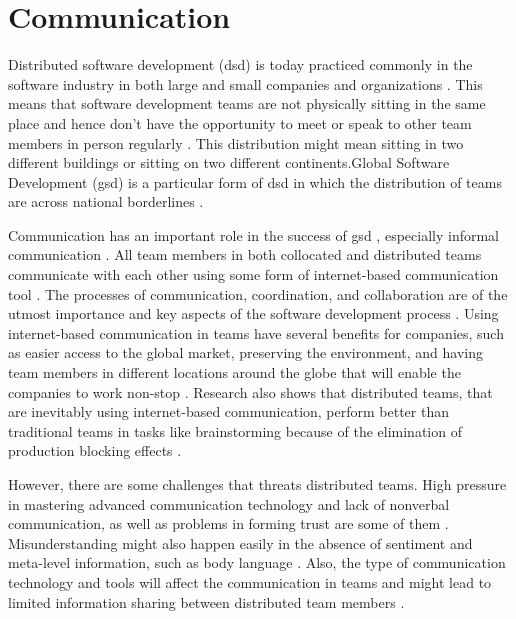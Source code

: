 \chapter{Communication}
Distributed software development (\ac{dsd}) is today practiced commonly in the software industry in both large and small companies and organizations \citep{shrivastava2010distributed}. This means that software development teams are not physically sitting in the same place and hence don’t have the opportunity to meet or speak to other team members in person regularly \citep{layman2006essential}. This distribution might mean sitting in two different buildings or sitting on two different continents.Global Software Development (\ac{gsd}) is a particular form of \ac{dsd} in which the distribution of teams are across national borderlines \citep{sahay2003global}. 

Communication has an important role in the success of \ac{gsd} \citep{carmel2001tactical,french1998study}, especially informal communication \citep{herbsleb2003empirical}. All team members in both collocated and distributed teams communicate with each other using some form of internet-based communication tool \citep{Kirkman2005}. The processes of communication, coordination, and collaboration are of the utmost importance and key aspects of the software development process \citep{colomo2014agile}. Using internet-based communication in teams have several benefits for companies, such as easier access to the global market, preserving the environment, and having team members in different locations around the globe that will enable the companies to work non-stop \citep{Cascio2000}. Research also shows that distributed teams, that are inevitably using internet-based communication, perform better than traditional teams in tasks like brainstorming because of the elimination of production blocking effects \citep{Espinosa2015}.

However, there are some challenges that threats distributed teams. High pressure in mastering advanced communication technology and lack of nonverbal communication, as well as problems in forming trust are some of them \citep{Jarvenpaa1998,Kayworth2002}. Misunderstanding might also happen easily in the absence of sentiment and meta-level information, such as body language \citep{Cramton2001}. Also, the type of communication technology and tools will affect the communication in teams and might lead to limited information sharing between distributed team members \citep{Gilson2015}.

